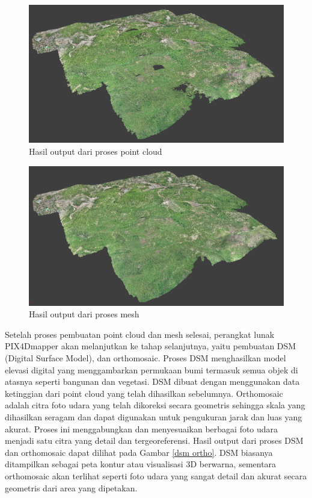\begin{figure} [H]
    \centering
    \includegraphics[width=1\linewidth]{image/point cloud.png}
    \caption{Hasil output dari proses point cloud}
    \label{point cloud pix}
\end{figure}

\begin{figure} [H]
    \centering
    \includegraphics[width=1\linewidth]{image/mesh.png}
    \caption{Hasil output dari proses mesh}
    \label{mesh pix}
\end{figure}

Setelah proses pembuatan point cloud dan mesh selesai, perangkat lunak PIX4Dmapper akan melanjutkan ke tahap selanjutnya, yaitu pembuatan DSM (Digital Surface Model), dan orthomosaic.
Proses DSM menghasilkan model elevasi digital yang menggambarkan permukaan bumi termasuk semua objek di atasnya seperti bangunan dan vegetasi. DSM dibuat dengan menggunakan data ketinggian dari point cloud yang telah dihasilkan sebelumnya. Orthomosaic adalah citra foto udara yang telah dikoreksi secara geometris sehingga skala yang dihasilkan seragam dan dapat digunakan untuk pengukuran jarak dan luas yang akurat. Proses ini menggabungkan dan menyesuaikan berbagai foto udara menjadi satu citra yang detail dan tergeoreferensi. Hasil output dari proses DSM dan orthomosaic dapat dilihat pada Gambar \ref{dsm ortho}. DSM biasanya ditampilkan sebagai peta kontur atau visualisasi 3D berwarna, sementara orthomosaic akan terlihat seperti foto udara yang sangat detail dan akurat secara geometris dari area yang dipetakan.

